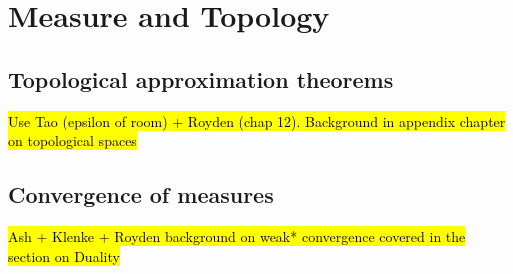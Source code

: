 
\chapter{Measure and Topology}

\section{Topological approximation theorems}

\hl{Use Tao (epsilon of room) + Royden (chap 12). Background in appendix chapter on topological spaces}

\section{Convergence of measures}

\hl{Ash + Klenke + Royden background on weak* convergence covered in the section on Duality}
